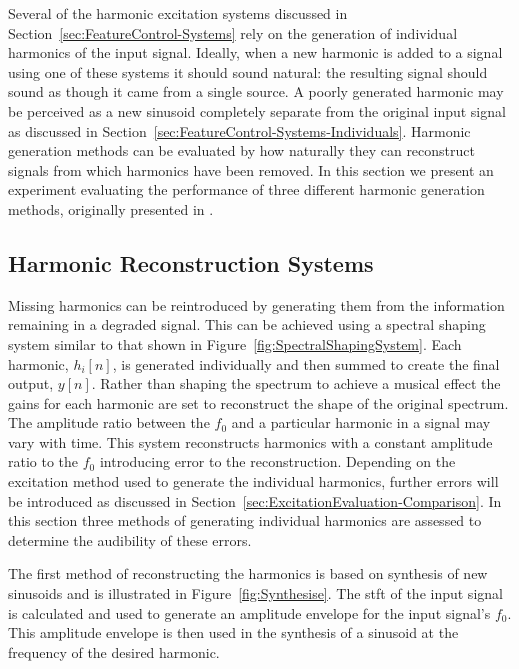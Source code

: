 	Several of the harmonic excitation systems discussed in Section~\ref{sec:FeatureControl-Systems} rely on the
	generation of individual harmonics of the input signal.  Ideally, when a new harmonic is added to a signal using
	one of these systems it should sound natural: the resulting signal should sound as though it came from a single
	source. A poorly generated harmonic may be perceived as a new sinusoid completely separate from the original input
	signal as discussed in Section~\ref{sec:FeatureControl-Systems-Individuals}.  Harmonic generation methods can be
	evaluated by how naturally they can reconstruct signals from which harmonics have been removed. In this section we
	present an experiment evaluating the performance of three different harmonic generation methods, originally
	presented in \citet{enderby2013methods}.

	\subsection{Harmonic Reconstruction Systems}
	\label{sec:PerceptualExperiments-Reconstruction-Systems}
		Missing harmonics can be reintroduced by generating them from the information remaining in a degraded
		signal. This can be achieved using a spectral shaping system similar to that shown in
		Figure~\ref{fig:SpectralShapingSystem}. Each harmonic, $h_{i}[n]$, is generated individually and then
		summed to create the final output, $y[n]$. Rather than shaping the spectrum to achieve a musical effect the
		gains for each harmonic are set to reconstruct the shape of the original spectrum. The amplitude ratio
		between the $f_{0}$ and a particular harmonic in a signal may vary with time. This system reconstructs
		harmonics with a constant amplitude ratio to the $f_{0}$ introducing error to the reconstruction. Depending
		on the excitation method used to generate the individual harmonics, further errors will be introduced as
		discussed in Section~\ref{sec:ExcitationEvaluation-Comparison}. In this section three methods of generating
		individual harmonics are assessed to determine the audibility of these errors.

		The first method of reconstructing the harmonics is based on synthesis of new sinusoids and is illustrated
		in Figure~\ref{fig:Synthesise}. The \acrshort{stft} of the input signal is calculated and used to generate
		an amplitude envelope for the input signal's $f_{0}$. This amplitude envelope is then used in the synthesis
		of a sinusoid at the frequency of the desired harmonic.

